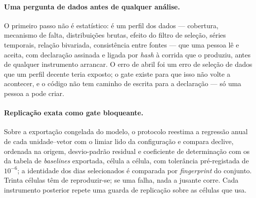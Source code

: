 \paragraph{Uma pergunta de dados antes de qualquer análise.} O primeiro
passo não é estatístico: é um perfil dos dados --- cobertura, mecanismo de
falta, distribuições brutas, efeito do filtro de seleção, séries temporais,
relação bivariada, consistência entre fontes --- que uma pessoa lê e
aceita, com declaração assinada e ligada por \emph{hash} à corrida que o
produziu, antes de qualquer instrumento arrancar. O erro de abril foi um
erro de seleção de dados que um perfil decente teria exposto; o gate
existe para que isso não volte a acontecer, e o código não tem caminho de
escrita para a declaração --- só uma pessoa a pode criar.

\paragraph{Replicação exata como gate bloqueante.} Sobre a exportação
congelada do modelo, o protocolo reestima a regressão anual de cada
unidade--vetor com o limiar lido da configuração e compara declive,
ordenada na origem, desvio-padrão residual e coeficiente de determinação
com os da tabela de \emph{baselines} exportada, célula a célula, com
tolerância pré-registada de $10^{-6}$; a identidade dos dias selecionados
é comparada por \emph{fingerprint} do conjunto. Trinta células têm de
reproduzir-se; se uma falha, nada a jusante corre. Cada instrumento
posterior repete uma guarda de replicação sobre as células que usa.

